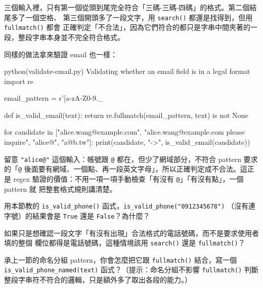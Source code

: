 
三個輸入裡，只有第一個從頭到尾完全符合「三碼-三碼-四碼」的格式。第二個結尾多了一個空格、
第三個開頭多了一段文字，用 \texttt{search()} 都還是找得到，但用 \texttt{fullmatch()} 都會
正確判定「不合法」，因為它們符合的都只是字串中間夾著的一段，整段字串本身並不完全符合格式。


同樣的做法拿來驗證 email 也一樣：

\begin{example}{python}{(validate-email.py) Validating whether an email field is in a legal format}
import re

email_pattern = r'[a-zA-Z0-9._%

def is_valid_email(text):
    return re.fullmatch(email_pattern, text) is not None

for candidate in ["alice.wang@example.com", "alice.wang@example.com please inquire",
                  "alice@", "a@b.tw"]:
    print(candidate, "->", is_valid_email(candidate))
\end{example}


留意 \texttt{"alice@"} 這個輸入：帳號跟 \texttt{@} 都在，但少了網域部分，不符合 pattern
要求的「\texttt{@} 後面要有網域、一個點、再一段英文字母」，所以正確判定成不合法。這正是
regex 驗證的價值：不用一項一項手動檢查「有沒有 \texttt{@}」「有沒有點」，一個 pattern 就
把整套格式規則講清楚。

\begin{drills}[label=drills:regex-fullmatch]
\item 用本節教的 \texttt{is\_valid\_phone()} 函式，\texttt{is\_valid\_phone("0912345678")}
（沒有連字號）的結果會是 \texttt{True} 還是 \texttt{False}？為什麼？
\item 如果只是想確認一段文字「有沒有出現」合法格式的電話號碼，而不是要求使用者填的整個
欄位都得是電話號碼，這種情境該用 \texttt{search()} 還是 \texttt{fullmatch()}？
\item 承上一節的命名分組 pattern，你會怎麼把它跟 \texttt{fullmatch()} 結合，寫一個
\texttt{is\_valid\_phone\_named(text)} 函式？（提示：命名分組不影響 \texttt{fullmatch()}
判斷整段字串符不符合的邏輯，只是額外多了取出各段的能力。）
\end{drills}

